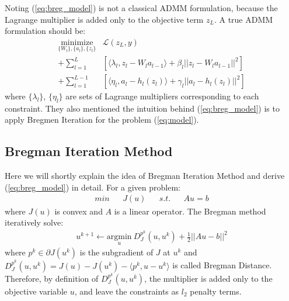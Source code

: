 \documentclass[letterpaper, 10 pt, conference]{ieeeconf}  %
\begin{document}
Noting (\ref{eq:breg_model}) is not a classical ADMM formulation, because the Lagrange multiplier is added only to the objective term $z_L$. A true ADMM formulation should be:
\begin{equation}
\begin{aligned}
\underset{\{W_l\},\{a_l\}, \{z_l\}}{\text{minimize}} & \mathcal{L}(z_L,y) \\
+  \sum_{l=1}^{L}&[\langle \lambda_l, z_l - W_la_{l-1} \rangle + \beta_l||z_l - W_la_{l-1}||^2] \\
+ \sum_{l=1}^{L-1}&[\langle \eta_l, a_l - h_l(z_l) \rangle + \gamma_l||a_l - h_l(z_l)||^2 ]
\label{eq:admm_model}
\end{aligned}
\end{equation}
where $\{\lambda_l\}$, $\{\eta_l\}$ are sets of Lagrange multipliers corresponding to each constraint. They also mentioned the intuition behind (\ref{eq:breg_model}) is to apply Bregmen Iteration \cite{10} for the problem (\ref{eq:model}). 

\subsection{Bregman Iteration Method} \label{breg_method}
Here we will shortly explain the idea of Bregman Iteration Method and derive (\ref{eq:breg_model}) in detail. For a given problem: 
\begin{equation}
\begin{aligned}
min && J(u) && s.t. && Au=b 
\end{aligned}
\end{equation}
where  $J(u)$ is convex and $A$ is a linear operator. The Bregman method iteratively solve:
\begin{equation}
\begin{aligned}
u^{k+1} \leftarrow \underset{u}{\text{argmin}} \: D_J^{p^k}(u, u^k) + {\frac{1}{2}}||Au - b||^2
\label{eq:breg}
\end{aligned} 
\end{equation}
where $p^k \in \partial J(u^k)$ is the subgradient of $J$ at $u^k$ and $D_J^{p^k}(u, u^k) = J(u) - J(u^k) - \langle p^k, u - u^k\rangle $ is called Bregman Distance. Therefore, by definition of $D_J^{p^k}(u, u^k)$, the multiplier is added only to the objective variable $u$, and leave the constraints as $l_2$ penalty terms.
\end{document}
